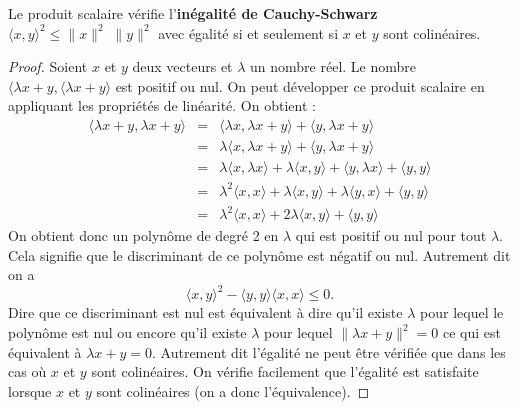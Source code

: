 \documentclass[class=report,crop=false]{standalone}
\begin{document}
\begin{theoreme} Le produit scalaire vérifie l'{\bf inégalité de Cauchy-Schwarz} $\langle x, y \rangle^2 \leqslant \|x\|^2\; \|y\|^2$ avec égalité si et seulement si $x$ et $y$ sont colinéaires.
\end{theoreme}
\begin{proof} 

Soient $x$ et $y$ deux vecteurs et $\lambda$ un nombre réel.
Le nombre $\langle \lambda x+y,\langle \lambda x+y\rangle$ est positif ou nul. On peut développer ce produit scalaire en appliquant les propriétés de linéarité. On obtient :
\begin{eqnarray*}
\langle \lambda x+y, \lambda x+y\rangle&=&\langle \lambda x, \lambda x+y\rangle+\langle y, \lambda x+y\rangle\\
&=&\lambda\langle  x, \lambda x+y\rangle+\langle y, \lambda x+y\rangle\\
&=& \lambda\langle  x, \lambda x\rangle+\lambda\langle  x, y\rangle+\langle y, \lambda x\rangle+\langle y,y\rangle\\
&=&\lambda^2\langle  x,  x\rangle+\lambda\langle  x, y\rangle+\lambda\langle y,  x\rangle+\langle y,y\rangle\\
&=&\lambda^2\langle  x,  x\rangle+2\lambda\langle  x, y\rangle+\langle y,y\rangle
\end{eqnarray*}
On obtient donc un polynôme de degré 2 en $\lambda$ qui est positif ou nul pour tout $\lambda$. Cela signifie que le discriminant de ce polynôme est négatif ou nul. Autrement dit on a
$$
\langle  x, y\rangle^2-\langle y,y\rangle\langle  x,  x\rangle\leq 0.
$$
Dire que ce discriminant est nul est équivalent \`a dire qu'il existe $\lambda$ pour lequel le polynôme est nul ou encore qu'il existe $\lambda$ pour lequel $\|\lambda x+y\|^2=0$ ce qui est équivalent \`a $\lambda x+y=0$. Autrement dit l'égalité ne peut être vérifiée que dans les cas où $x$ et $y$ sont colinéaires. On vérifie facilement que l'égalité est satisfaite lorsque $x$ et $y$ sont colinéaires (on a donc l'équivalence). 
\end{proof}
\end{document}
